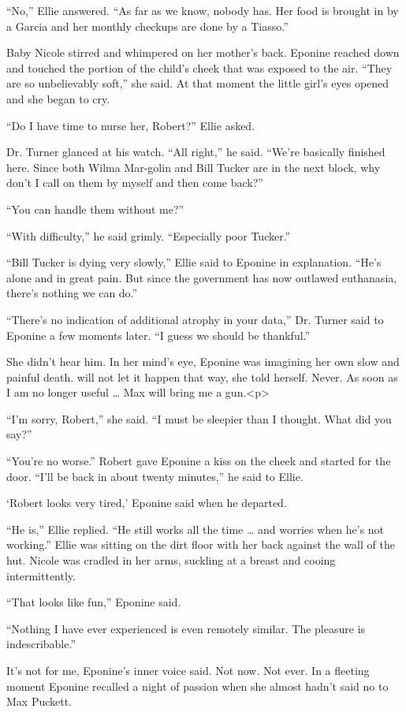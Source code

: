 \documentclass[]{article}
\begin{document}
{{“No,” Ellie answered. “As far as we know, nobody has. Her food is brought in by a Garcia and her monthly checkups are done by a Tiasso.”

Baby Nicole stirred and whimpered on her mother’s back. Eponine reached down and touched the portion of the child’s cheek that was exposed to the air. “They are so unbelievably soft,” she said. At that moment the little girl’s eyes opened and she began to cry.

“Do I have time to nurse her, Robert?” Ellie asked.

Dr. Turner glanced at his watch. “All right,” he said. “We’re basically finished here. Since both Wilma Mar-golin and Bill Tucker are in the next block, why don’t I call on them by myself and then come back?”

“You can handle them without me?”

“With difficulty,” he said grimly. “Especially poor Tucker.”

“Bill Tucker is dying very slowly,” Ellie said to Eponine in explanation. “He’s alone and in great pain. But since the government has now outlawed euthanasia, there’s nothing we can do.”

“There’s no indication of additional atrophy in your data,” Dr. Turner said to Eponine a few moments later. “I guess we should be thankful.”

She didn’t hear him. In her mind’s eye, Eponine was imagining her own slow and painful death. will not let it happen that way, she told herself. Never. As soon as I am no longer useful … Max will bring me a gun.<p>

“I’m sorry, Robert,” she said. “I must be sleepier than I thought. What did you say?”

“You’re no worse.” Robert gave Eponine a kiss on the cheek and started for the door. “I’ll be back in about twenty minutes,” he said to Ellie.

‘Robert looks very tired,’ Eponine said when he departed.

“He is,” Ellie replied. “He still works all the time … and worries when he’s not working.” Ellie was sitting on the dirt floor with her back against the wall of the hut. Nicole was cradled in her arms, suckling at a breast and cooing intermittently.

“That looks like fun,” Eponine said.

“Nothing I have ever experienced is even remotely similar. The pleasure is indescribable.”

It’s not for me, Eponine’s inner voice said. Not now. Not ever. In a fleeting moment Eponine recalled a night of passion when she almost hadn’t said no to Max Puckett.

}}
\end{document}
